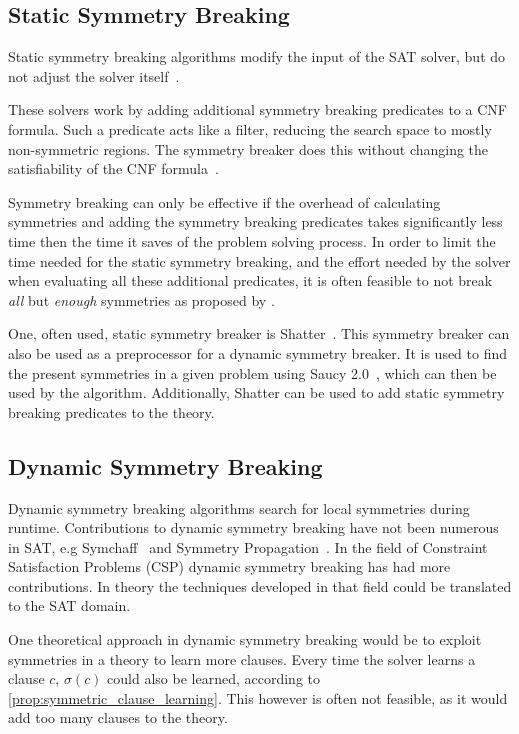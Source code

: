 \subsection{Static Symmetry Breaking}
	Static symmetry breaking algorithms modify the input of the SAT solver, but do not
	adjust the solver itself~\cite{sakallah2009symmetry}.

	These solvers work by adding additional symmetry breaking predicates to a CNF 
	formula. Such a predicate acts like a filter, reducing the search space to mostly
	non-symmetric regions.
	The symmetry breaker does this without changing the satisfiability of the CNF formula~\cite{aloul2003shatter}.

	Symmetry breaking can only be effective if the overhead of calculating symmetries and
	adding the symmetry breaking predicates takes significantly less time then the time it
	saves of the problem solving process. In order to limit the time needed for the static
	symmetry breaking, and the effort needed by the solver when evaluating all these
	additional predicates, it is often feasible to not break \emph{all} but \emph{enough} 
	symmetries as proposed by \cite{aloul2003shatter}.
	
	One, often used, static symmetry breaker is Shatter~\cite{aloul2003shatter}.
	This symmetry breaker can also be used as a preprocessor for a dynamic symmetry breaker.
	It is used to find the present symmetries in a given problem using Saucy 2.0~\cite{darga2004exploiting},
	which can then be used by the algorithm.
	Additionally, Shatter can be used to add static symmetry breaking predicates to the theory.

\subsection{Dynamic Symmetry Breaking}
	Dynamic symmetry breaking algorithms search for local symmetries during runtime.
	Contributions to dynamic symmetry breaking have not been numerous in SAT,
	e.g Symchaff~\cite{sabharwal2005symchaff} and Symmetry Propagation~\cite{devriendt2012symmetry}.
	In the field of Constraint Satisfaction	Problems (CSP) dynamic symmetry breaking has had more contributions.
	In theory the techniques developed in that field could be translated to the SAT domain.

	One theoretical approach in dynamic symmetry breaking would be to exploit symmetries in
	a theory to learn more clauses.
	Every time the solver learns a clause $c$, $\sigma(c)$ could also be learned, according
	to \cref{prop:symmetric_clause_learning}.
	This however is often not feasible, as it would add too many clauses to the theory.

